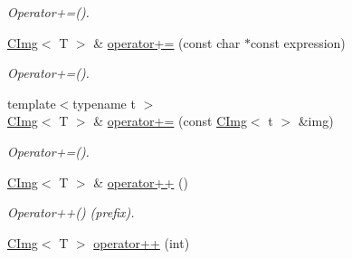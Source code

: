 \begin{DoxyCompactItemize}
\begin{DoxyCompactList}\small\item\em Operator+=(). \item\end{DoxyCompactList}\item 
\hypertarget{structcimg__library_1_1CImg_a6a931e476a2e707a43dc48bf35835422}{
\hyperlink{structcimg__library_1_1CImg}{CImg}$<$ T $>$ \& \hyperlink{structcimg__library_1_1CImg_a6a931e476a2e707a43dc48bf35835422}{operator+=} (const char $\ast$const expression)}
\label{structcimg__library_1_1CImg_a6a931e476a2e707a43dc48bf35835422}

\begin{DoxyCompactList}\small\item\em Operator+=(). \item\end{DoxyCompactList}\item 
\hypertarget{structcimg__library_1_1CImg_a8ad4dd16205403c4bde19d8982dba57e}{
{\footnotesize template$<$typename t $>$ }\\\hyperlink{structcimg__library_1_1CImg}{CImg}$<$ T $>$ \& \hyperlink{structcimg__library_1_1CImg_a8ad4dd16205403c4bde19d8982dba57e}{operator+=} (const \hyperlink{structcimg__library_1_1CImg}{CImg}$<$ t $>$ \&img)}
\label{structcimg__library_1_1CImg_a8ad4dd16205403c4bde19d8982dba57e}

\begin{DoxyCompactList}\small\item\em Operator+=(). \item\end{DoxyCompactList}\item 
\hypertarget{structcimg__library_1_1CImg_aed696f4e890e8da6f6ebaa3171aa2dd7}{
\hyperlink{structcimg__library_1_1CImg}{CImg}$<$ T $>$ \& \hyperlink{structcimg__library_1_1CImg_aed696f4e890e8da6f6ebaa3171aa2dd7}{operator++} ()}
\label{structcimg__library_1_1CImg_aed696f4e890e8da6f6ebaa3171aa2dd7}

\begin{DoxyCompactList}\small\item\em Operator++() (prefix). \item\end{DoxyCompactList}\item 
\hypertarget{structcimg__library_1_1CImg_a694b492d0726df1797d5d6e4da74dfb4}{
\hyperlink{structcimg__library_1_1CImg}{CImg}$<$ T $>$ \hyperlink{structcimg__library_1_1CImg_a694b492d0726df1797d5d6e4da74dfb4}{operator++} (int)}
\label{structcimg__library_1_1CImg_a694b492d0726df1797d5d6e4da74dfb4}


\end{DoxyCompactItemize}
